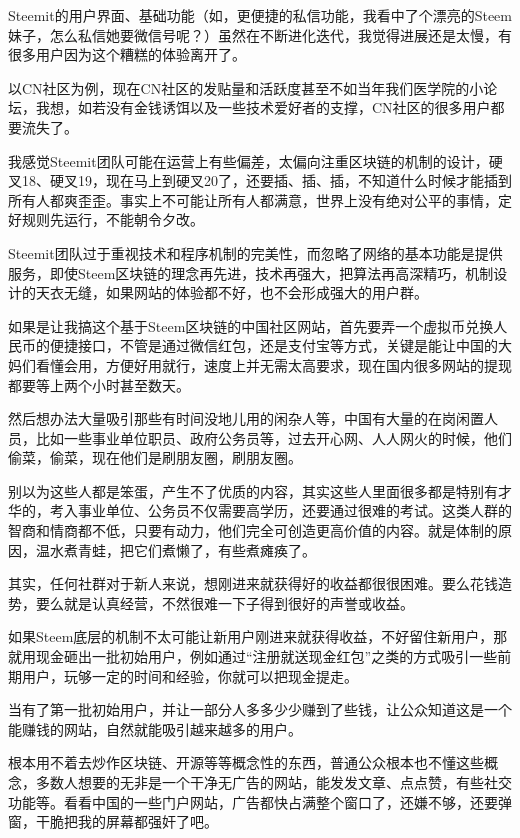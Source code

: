 \documentclass[]{ctexbook}
\begin{document}
Steemit的用户界面、基础功能（如，更便捷的私信功能，我看中了个漂亮的Steem妹子，怎么私信她要微信号呢？）虽然在不断进化迭代，我觉得进展还是太慢，有很多用户因为这个糟糕的体验离开了。

以CN社区为例，现在CN社区的发贴量和活跃度甚至不如当年我们医学院的小论坛，我想，如若没有金钱诱饵以及一些技术爱好者的支撑，CN社区的很多用户都要流失了。

我感觉Steemit团队可能在运营上有些偏差，太偏向注重区块链的机制的设计，硬叉18、硬叉19，现在马上到硬叉20了，还要插、插、插，不知道什么时候才能插到所有人都爽歪歪。事实上不可能让所有人都满意，世界上没有绝对公平的事情，定好规则先运行，不能朝令夕改。

Steemit团队过于重视技术和程序机制的完美性，而忽略了网络的基本功能是提供服务，即使Steem区块链的理念再先进，技术再强大，把算法再高深精巧，机制设计的天衣无缝，如果网站的体验都不好，也不会形成强大的用户群。

如果是让我搞这个基于Steem区块链的中国社区网站，首先要弄一个虚拟币兑换人民币的便捷接口，不管是通过微信红包，还是支付宝等方式，关键是能让中国的大妈们看懂会用，方便好用就行，速度上并无需太高要求，现在国内很多网站的提现都要等上两个小时甚至数天。

然后想办法大量吸引那些有时间没地儿用的闲杂人等，中国有大量的在岗闲置人员，比如一些事业单位职员、政府公务员等，过去开心网、人人网火的时候，他们偷菜，偷菜，现在他们是刷朋友圈，刷朋友圈。

别以为这些人都是笨蛋，产生不了优质的内容，其实这些人里面很多都是特别有才华的，考入事业单位、公务员不仅需要高学历，还要通过很难的考试。这类人群的智商和情商都不低，只要有动力，他们完全可创造更高价值的内容。就是体制的原因，温水煮青蛙，把它们煮懒了，有些煮瘫痪了。

其实，任何社群对于新人来说，想刚进来就获得好的收益都很很困难。要么花钱造势，要么就是认真经营，不然很难一下子得到很好的声誉或收益。

如果Steem底层的机制不太可能让新用户刚进来就获得收益，不好留住新用户，那就用现金砸出一批初始用户，例如通过``注册就送现金红包''之类的方式吸引一些前期用户，玩够一定的时间和经验，你就可以把现金提走。

当有了第一批初始用户，并让一部分人多多少少赚到了些钱，让公众知道这是一个能赚钱的网站，自然就能吸引越来越多的用户。

根本用不着去炒作区块链、开源等等概念性的东西，普通公众根本也不懂这些概念，多数人想要的无非是一个干净无广告的网站，能发发文章、点点赞，有些社交功能等。看看中国的一些门户网站，广告都快占满整个窗口了，还嫌不够，还要弹窗，干脆把我的屏幕都强奸了吧。
\end{document}
